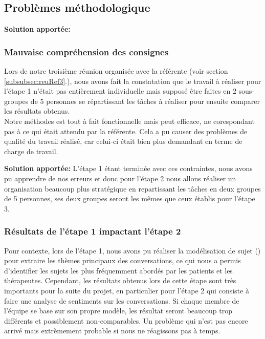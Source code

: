 \documentclass[12pt,a4paper]{article}
\begin{document}
\pagebreak
\subsection{Problèmes méthodologique}

\hspace{0.5cm}\textbf{Solution apportée:}
\subsubsection{Mauvaise compréhension des consignes}\label{subsubsec:probMethoConsignes}
Lors de notre troisième réunion organisée avec la référente (voir section \ref{subsubsec:reuRef3}.),
nous avons fait la constatation que le travail à réaliser pour l'étape 1 n'était pas entièrement individuelle mais supposé être faites en 2 sous-groupes 
de 5 personnes se répartissant les tâches à réaliser pour ensuite comparer les résultats obtenus.\\
Notre méthodes est tout à fait fonctionnelle mais peut efficace, ne corespondant pas à ce qui était attendu par la référente.
Cela a pu causer des problèmes de qualité du travail réalisé, car celui-ci était bien plus demandant en terme de charge de travail. \smallbreak 

\hspace{0.5cm}\textbf{Solution apportée:} L'étape 1 étant terminée avec ces contraintes, nous avons pu apprendre de nos
erreurs et donc pour l'étape 2 nous allons réaliser un organisation beaucoup plus stratégique en repartissant 
les tâches en deux groupes de 5 personnes, ses deux groupes seront les mêmes que ceux établis pour l'étape 3. 

\subsubsection{Résultats de l'étape 1 impactant l'étape 2}\label{subsubsec:probMethoResEtape1}
Pour contexte, lors de l'étape 1, nous avons pu réaliser la modélisation de sujet () 
pour extraire les thèmes principaux des conversations, ce qui nous a permis d'identifier les sujets les plus 
fréquemment abordés par les patients et les thérapeutes. 
Cependant, les résultats obtenus lors de cette étape sont très importants pour la suite du projet, 
en particulier pour l'étape 2 qui consiste à faire une analyse de sentiments sur les conversations. 
Si chaque membre de l'équipe se base sur son propre modèle, les résultat seront beaucoup trop différents
et possiblement non-comparables.\smallbreak
Un problème qui n'est pas encore arrivé mais extrèmement probable si nous ne réagissons pas à temps.
\end{document}

